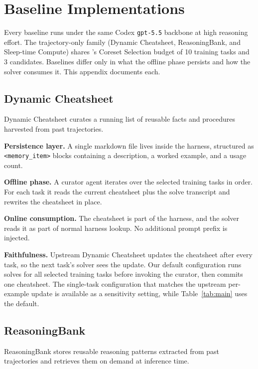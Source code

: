 \section{Baseline Implementations}\label{app:baselines}

 Every baseline runs under the same Codex \texttt{gpt-5.5} backbone at high reasoning effort.
The trajectory-only family (Dynamic Cheatsheet, ReasoningBank, and Sleep-time Compute) shares \method{}'s Coreset Selection budget of 10 training tasks and 3 candidates.
Baselines differ only in what the offline phase persists and how the solver consumes it.
This appendix documents each.

\subsection{Dynamic Cheatsheet \citep{suzgun2025dynamiccheatsheet}}

Dynamic Cheatsheet curates a running list of reusable facts and procedures harvested from past trajectories.

\noindent\textbf{Persistence layer.}
A single markdown file lives inside the harness, structured as \texttt{<memory\_item>} blocks containing a description, a worked example, and a usage count.

\noindent\textbf{Offline phase.}
A curator agent iterates over the selected training tasks in order.
For each task it reads the current cheatsheet plus the solve transcript and rewrites the cheatsheet in place.

\noindent\textbf{Online consumption.}
The cheatsheet is part of the harness, and the solver reads it as part of normal harness lookup.
No additional prompt prefix is injected.

\noindent\textbf{Faithfulness.}
Upstream Dynamic Cheatsheet updates the cheatsheet after every task, so the next task's solver sees the update.
Our default configuration runs solves for all selected training tasks before invoking the curator, then commits one cheatsheet.
The single-task configuration that matches the upstream per-example update is available as a sensitivity setting, while Table~\ref{tab:main} uses the default.

\subsection{ReasoningBank \citep{ouyang2026reasoningbank}}

ReasoningBank stores reusable reasoning patterns extracted from past trajectories and retrieves them on demand at inference time.

